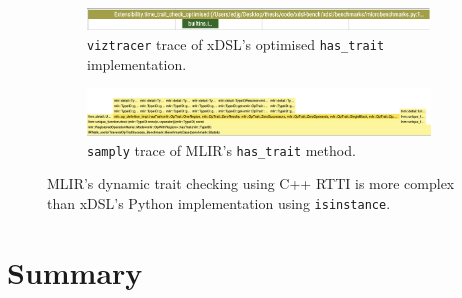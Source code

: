\begin{figure}[H]
    \centering
    \begin{subfigure}[b]{\textwidth}
        \includegraphics[width=\textwidth]{images/impact_dynamism/hastrait_xdsl_viztracer_optimised.png}
        \caption{\texttt{viztracer} trace of xDSL's optimised \texttt{has_trait} implementation.}
        \label{fig:ubenchmark-hastrait-xdsl-viztracer-optimised}
    \end{subfigure}
    \begin{subfigure}[b]{\textwidth}
        \includegraphics[width=\textwidth]{images/impact_dynamism/hastrait_mlir_samply.png}
        \caption{\texttt{samply} trace of MLIR's \texttt{has_trait} method.}
        \label{fig:ubenchmark-hastrait-mlir-samply}
    \end{subfigure}
    \caption{MLIR's dynamic trait checking using C++ RTTI is more complex than xDSL's Python implementation using \texttt{isinstance}.}
    \label{fig:ubenchmark-hastrait-dynamism}
\end{figure}







\section{Summary}
















